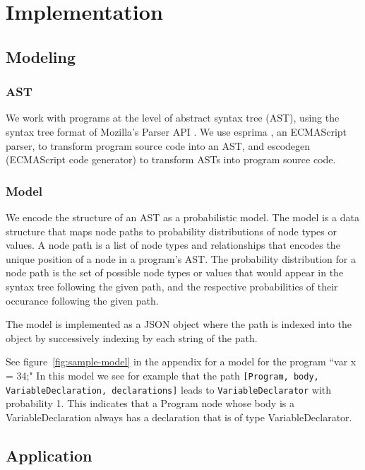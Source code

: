 \documentclass{article}
\begin{document}

\section{Implementation}

\subsection{Modeling}

\subsubsection{AST}

We work with programs at the level of abstract syntax tree (AST), using the
syntax tree format of Mozilla's Parser API \cite{parser api}. We use esprima
\cite{esprima}, an ECMAScript parser, to transform program source code into an
AST, and escodegen \cite{escodegen} (ECMAScript code generator) to transform
ASTs into program source code.

\subsubsection{Model}

We encode the structure of an AST as a probabilistic model. The model is a data
structure that maps node paths to probability distributions of node types or
values. A node path is a list of node types and relationships that encodes the
unique position of a node in a program's AST. The probability distribution for a
node path is the set of possible node types or values that would appear in the
syntax tree following the given path, and the respective probabilities of their
occurance following the given path.

The model is implemented as a JSON object where the path is indexed into the
object by successively indexing by each string of the path.

See figure~\ref{fig:sample-model} in the appendix for a model for the program
``var x = 34;" In this model we see for example that the path
\texttt{[Program, body, VariableDeclaration, declarations]} leads to
\texttt{VariableDeclarator} with probability 1. This indicates that a Program
node whose body is a VariableDeclaration always has a declaration that is of
type VariableDeclarator.

\clearpage
\subsection{Application}
\end{document}
